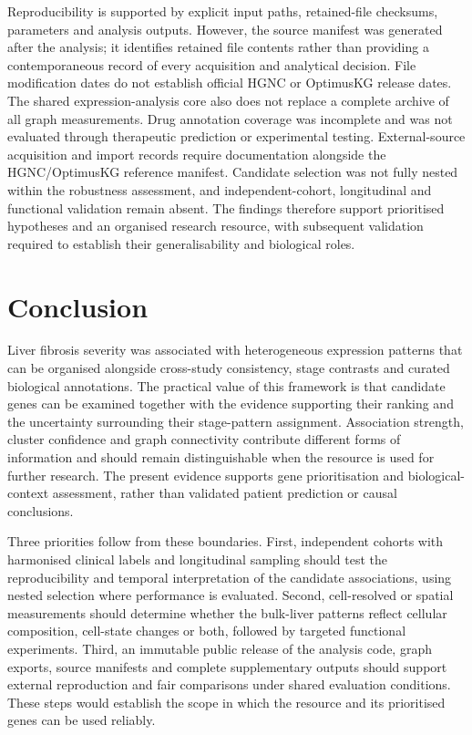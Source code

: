 \documentclass[11pt,a4paper]{article}
\begin{document}
Reproducibility is supported by explicit input paths, retained-file checksums, parameters and analysis outputs. However, the source manifest was generated after the analysis; it identifies retained file contents rather than providing a contemporaneous record of every acquisition and analytical decision. File modification dates do not establish official HGNC or OptimusKG release dates. The shared expression-analysis core also does not replace a complete archive of all graph measurements. Drug annotation coverage was incomplete and was not evaluated through therapeutic prediction or experimental testing. External-source acquisition and import records require documentation alongside the HGNC/OptimusKG reference manifest. Candidate selection was not fully nested within the robustness assessment, and independent-cohort, longitudinal and functional validation remain absent. The findings therefore support prioritised hypotheses and an organised research resource, with subsequent validation required to establish their generalisability and biological roles.

\section*{Conclusion}
Liver fibrosis severity was associated with heterogeneous expression patterns that can be organised alongside cross-study consistency, stage contrasts and curated biological annotations. The practical value of this framework is that candidate genes can be examined together with the evidence supporting their ranking and the uncertainty surrounding their stage-pattern assignment. Association strength, cluster confidence and graph connectivity contribute different forms of information and should remain distinguishable when the resource is used for further research. The present evidence supports gene prioritisation and biological-context assessment, rather than validated patient prediction or causal conclusions.

Three priorities follow from these boundaries. First, independent cohorts with harmonised clinical labels and longitudinal sampling should test the reproducibility and temporal interpretation of the candidate associations, using nested selection where performance is evaluated. Second, cell-resolved or spatial measurements should determine whether the bulk-liver patterns reflect cellular composition, cell-state changes or both, followed by targeted functional experiments. Third, an immutable public release of the analysis code, graph exports, source manifests and complete supplementary outputs should support external reproduction and fair comparisons under shared evaluation conditions. These steps would establish the scope in which the resource and its prioritised genes can be used reliably.
\end{document}
